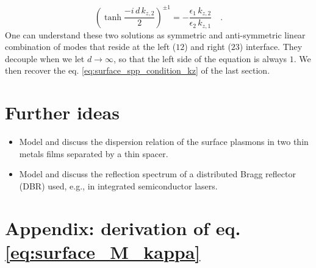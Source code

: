 \begin{equation}
 \left( \tanh\frac{ -i \, d \, k_{z,2}  }{2} \right)^{\pm 1} = - \frac{ \epsilon_1 \, k_{z,2}  }{ \epsilon_2 \, k_{z,1} } \quad . 
\end{equation} 
One can understand these two solutions as symmetric and anti-symmetric linear combination of modes that reside at the left ($12$)  and right ($23$) interface. They decouple when we let $d \rightarrow \infty$, so that the left side of the equation is always $1$.  We then recover the eq. \ref{eq:surface_spp_condition_kz} of the last section.



\section{Further ideas}

\begin{itemize}
\item Model and discuss the dispersion relation of the surface plasmons in two thin metals films separated by a thin spacer.

\item Model and discuss the reflection spectrum of  a distributed Bragg reflector (DBR) used, e.g., in integrated semiconductor lasers.
\end{itemize}


\section{Appendix: derivation of eq. \ref{eq:surface_M_kappa}}


